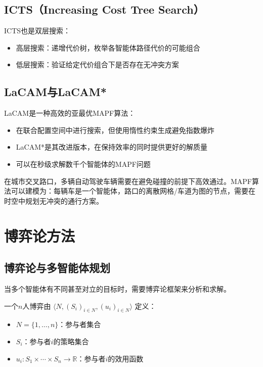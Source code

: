 \subsection{ICTS（Increasing Cost Tree Search） \grad}

ICTS也是双层搜索：
\begin{itemize}
  \item 高层搜索：递增代价树，枚举各智能体路径代价的可能组合
  \item 低层搜索：验证给定代价组合下是否存在无冲突方案
\end{itemize}

\subsection{LaCAM与LaCAM* \grad}

LaCAM是一种高效的亚最优MAPF算法：
\begin{itemize}
  \item 在联合配置空间中进行搜索，但使用惰性约束生成避免指数爆炸
  \item LaCAM*是其改进版本，在保持效率的同时提供更好的解质量
  \item 可以在秒级求解数千个智能体的MAPF问题
\end{itemize}

\begin{appbox}[title={\textbf{应用：自动驾驶交叉路口协调}}]
在城市交叉路口，多辆自动驾驶车辆需要在避免碰撞的前提下高效通过。MAPF算法可以建模为：每辆车是一个智能体，路口的离散网格/车道为图的节点，需要在时空中规划无冲突的通行方案。
\end{appbox}

\section{博弈论方法 \grad}

\subsection{博弈论与多智能体规划}

当多个智能体有不同甚至对立的目标时，需要博弈论框架来分析和求解。

\begin{definition}[正则形式博弈]
一个$n$人博弈由 $\langle N, (S_i)_{i \in N}, (u_i)_{i \in N} \rangle$ 定义：
\begin{itemize}
  \item $N = \{1, \ldots, n\}$：参与者集合
  \item $S_i$：参与者$i$的策略集合
  \item $u_i: S_1 \times \cdots \times S_n \rightarrow \mathbb{R}$：参与者$i$的效用函数
\end{itemize}
\end{definition}

